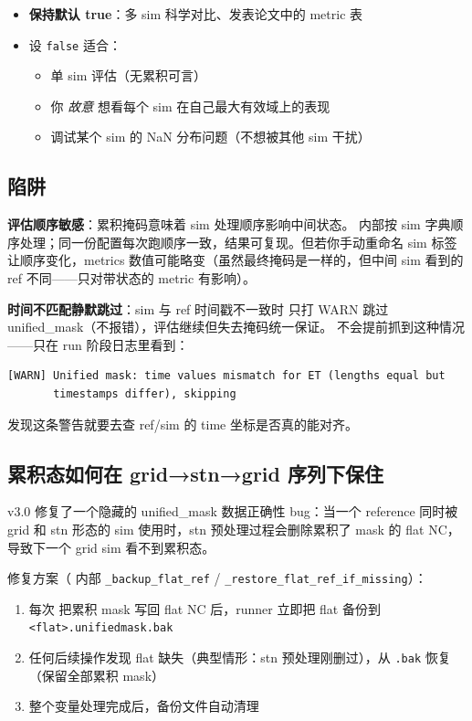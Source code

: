 \begin{itemize}
  \item \textbf{保持默认 true}：多 sim 科学对比、发表论文中的 metric 表
  \item 设 \texttt{false} 适合：
  \begin{itemize}
    \item 单 sim 评估（无累积可言）
    \item 你 \emph{故意} 想看每个 sim 在自己最大有效域上的表现
    \item 调试某个 sim 的 NaN 分布问题（不想被其他 sim 干扰）
  \end{itemize}
\end{itemize}

\subsection{陷阱}

\textbf{评估顺序敏感}：累积掩码意味着 sim 处理顺序影响中间状态。\openbench{} 内部按 sim 字典顺序处理；同一份配置每次跑顺序一致，结果可复现。但若你手动重命名 sim 标签让顺序变化，metrics 数值可能略变（虽然最终掩码是一样的，但中间 sim 看到的 ref 不同——只对带状态的 metric 有影响）。

\textbf{时间不匹配静默跳过}：sim 与 ref 时间戳不一致时 \openbench{} 只打 WARN 跳过 unified\_mask（不报错），评估继续但失去掩码统一保证。 不会提前抓到这种情况——只在 run 阶段日志里看到：

\begin{verbatim}
[WARN] Unified mask: time values mismatch for ET (lengths equal but
       timestamps differ), skipping
\end{verbatim}

发现这条警告就要去查 ref/sim 的 time 坐标是否真的能对齐。

\subsection{累积态如何在 grid→stn→grid 序列下保住}

\openbench{} v3.0 修复了一个隐藏的 unified\_mask 数据正确性 bug：当一个 reference 同时被 grid 和 stn 形态的 sim 使用时，stn 预处理过程会删除累积了 mask 的 flat NC，导致下一个 grid sim 看不到累积态。

修复方案（ 内部 \texttt{\_backup\_flat\_ref} / \texttt{\_restore\_flat\_ref\_if\_missing}）：

\begin{enumerate}
  \item 每次  把累积 mask 写回 flat NC 后，runner 立即把 flat 备份到 \texttt{<flat>.unifiedmask.bak}
  \item 任何后续操作发现 flat 缺失（典型情形：stn 预处理刚删过），从 \texttt{.bak} 恢复（保留全部累积 mask）
  \item 整个变量处理完成后，备份文件自动清理
\end{enumerate}

